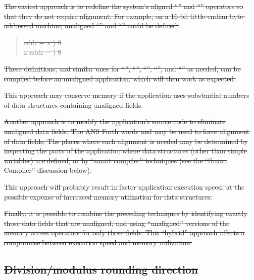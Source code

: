 \begin{description}
\sout{%
	The easiest approach is to redefine the system's aligned
	``'' and ``\word{!}'' operators so that they do not
	require alignment. For example, on a 16-bit little-endian
	byte-addressed machine, unaligned ``'' and ``\word{!}''
	could be defined:}
	\begin{quote}\ttfamily
		\sout{\word{:}   addr -{}- x )
			  
			  8
			 
		\word{;}} \\
		\sout{\word{:} \word{!}  x addr -{}- )
			 8 
			 
			\word{C!} 
		\word{;}}
	\end{quote}
\sout{%
	These definitions, and similar ones for ``\word{+!}'',
	``'', ``'', ``\word{,}'', and
	``'' as needed, can be compiled before an
	unaligned application, which will then work as expected.}

\sout{%
	This approach may conserve memory if the application uses
	substantial numbers of data structures containing unaligned
	fields.}

\sout{%
	Another approach is to modify the application's source code to
	eliminate unaligned data fields. The ANS Forth words 
	and  may be used to force alignment of data fields.
	The places where such alignment is needed may be determined by
	inspecting the parts of the application where data structures
	(other than simple variables) are defined, or by ``smart compiler''
	techniques (see the ``Smart Compiler'' discussion below).}

\sout{%
	This approach will probably result in faster application execution
	speed, at the possible expense of increased memory utilization for
	data structures.}

\sout{%
	Finally, it is possible to combine the preceding techniques by
	identifying exactly those data fields that are unaligned, and
	using ``unaligned'' versions of the memory access operators for
	only those fields. This ``hybrid'' approach affects a compromise
	between execution speed and memory utilization.}
\end{description}


\subsection[Division/modulus rounding direction]{\sout{Division/modulus rounding direction}} %

